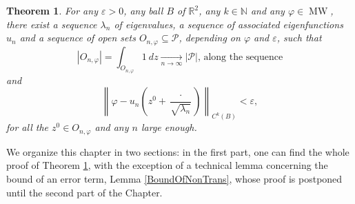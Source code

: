 \documentclass{amsart}
\newtheorem{theorem}{Theorem}[section]
\theoremstyle{definition}
\theoremstyle{remark}
\newcommand{\ep}{\varepsilon}
\newcommand{\vp}{\varphi}
\numberwithin{equation}{section}
\theoremstyle{definition}
\theoremstyle{remark}
\DeclareMathOperator\MW{MW}
\begin{document}
    
\begin{theorem}\label{pnft}
	For any $\ep>0$, any ball $B$ of $\mathbb{R}^2$, any $k\in\mathbb{N}$ and any $\vp\in\MW$, there exist a sequence $\lambda_n$ of eigenvalues, a sequence of associated eigenfunctions $u_{n}$ and a sequence of open sets $O_{n,\varphi}\subseteq \mathcal{P}$, depending on $\varphi$ and $\ep$, such that \begin{equation}
		|O_{n,\varphi}|=\int_{O_{n,\varphi}}1\ dz\xrightarrow[n\rightarrow\infty]{}\left|\mathcal{P}\right|\text{, along the sequence}
	\end{equation}and \begin{equation}
		\left\|\vp-u_{n}\left(z^0+\frac{\cdot}{\sqrt{\lambda_n}}\right)\right\|_{C^k(B)}<\ep,
	\end{equation}for all the $z^0\in O_{n,\varphi}$ and any $n$ large enough.
	
\end{theorem}
We organize this chapter in two sections: in the first part, one can find the whole proof of Theorem \ref{pnft}, with the exception of a technical lemma concerning the bound of an error term, Lemma \ref{BoundOfNonTrans}, whose proof is postponed until the second part of the Chapter. 
\end{document}
